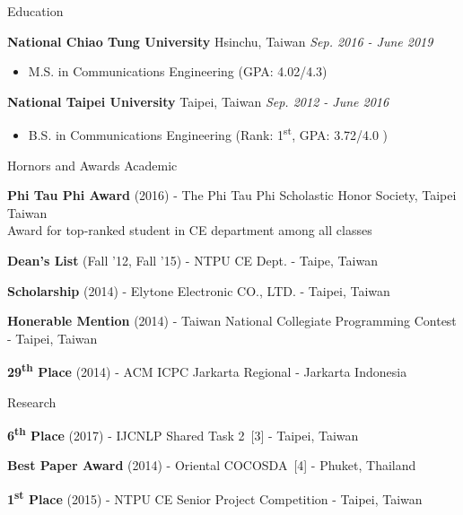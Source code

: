 \documentclass{resume} %
\newcommand{\ts}{\textsuperscript}
\begin{document}

\begin{rSection}{Education}

{\bf National Chiao Tung University} \hfill{Hsinchu, Taiwan} \hfill{\em Sep. 2016 - June 2019}
\begin{itemize} \item {M.S. in Communications Engineering (GPA: 4.02/4.3)} \end{itemize}
{\bf National Taipei University}\hspace*{2em} \hfill{Taipei, Taiwan} \hfill{\em Sep. 2012 - June 2016}
\begin{itemize} \item {B.S. in Communications Engineering (Rank: 1\ts{st}, GPA: 3.72/4.0 )} \end{itemize}
\end{rSection}


\begin{rSection}{Hornors and Awards}
    Academic
    \begin{rSubsection}{}{}{}{}
    \item {\bf Phi Tau Phi Award} (2016) - The Phi Tau Phi Scholastic Honor Society, Taipei Taiwan \\
    Award for top-ranked student in CE department among all classes
    \item {\bf Dean's List} (Fall '12, Fall '15) - NTPU CE Dept. - Taipe, Taiwan
    \item {\bf Scholarship} (2014) - Elytone Electronic CO., LTD. - Taipei, Taiwan
    \item {\bf Honerable Mention} (2014) - Taiwan National Collegiate Programming Contest - Taipei, Taiwan
    \item {\bf 29\ts{th} Place} (2014) - ACM ICPC Jarkarta Regional - Jarkarta Indonesia
    \end{rSubsection}
    
    Research
    \begin{rSubsection}{}{}{}{}
    \item {\bf 6\ts{th} Place} (2017) - IJCNLP Shared Task 2~[3] - Taipei, Taiwan
    \item {\bf Best Paper Award} (2014) - Oriental COCOSDA~[4] - Phuket, Thailand
    \item {\bf 1\ts{st} Place} (2015) - NTPU CE Senior Project Competition - Taipei, Taiwan
    \end{rSubsection}
    
    \end{rSection}
\end{document}
